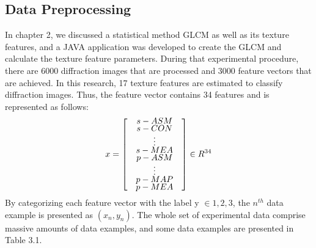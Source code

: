 \subsection{Data Preprocessing}
In chapter 2, we discussed a statistical method GLCM as well as its texture features, and a JAVA application was developed to create the GLCM and calculate the texture feature parameters. During that experimental procedure, there are 6000 diffraction images that are processed and 3000 feature vectors that are achieved. In this research, 17 texture features are estimated to classify diffraction images. Thus, the feature vector contains 34 features and is represented as follows:
\begin{align*}
x = 
\renewcommand{\arraystretch}{0.5}
\begin{bmatrix}
    & s-ASM & \\
    & s-CON & \\
    & \vdots & \\
    & s-MEA & \\
    & p-ASM & \\
    & \vdots & \\
    & p-MAP & \\
    & p-MEA & 
\end{bmatrix}
\in R^{34}
\end{align*}
By categorizing each feature vector with the label y $\in {1,2,3}$, the $n^{th}$ data example is presented as $(x_n,y_n)$. The whole set of experimental data comprise massive amounts of data examples, and some data examples are presented in Table 3.1.
